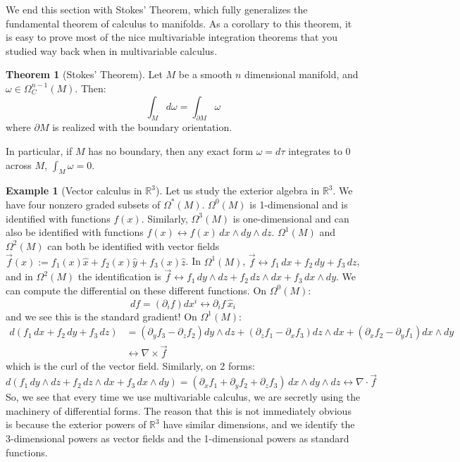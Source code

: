 \documentclass[11pt, oneside]{article}   	%
\theoremstyle{definition}
\newtheorem{theorem}{Theorem}[section]
\newtheorem{example}{Example}[section]
\begin{document}
We end this section with Stokes' Theorem, which fully generalizes the fundamental theorem of calculus to manifolds. 
As a corollary to this theorem, it is easy to prove most of the nice multivariable integration theorems that you studied way 
back when in multivariable calculus.
\begin{theorem}[Stokes' Theorem]
	Let $M$ be a smooth $n$ dimensional manifold, and $\omega\in\Omega_C^{n - 1}(M)$. Then:
	\begin{equation}
		\int_M d\omega = \int_{\partial M}\omega
	\end{equation}
	where $\partial M$ is realized with the boundary orientation.
\end{theorem}

In particular, if $M$ has no boundary, then any exact form $\omega = d\tau$ integrates to 0 across $M$, $\int_M \omega = 0$. 
\begin{example}[Vector calculus in $\mathbb R^3$]
	Let us study the exterior algebra in $\mathbb R^3$. We have four nonzero graded subsets of $\Omega^*(M)$. 
	$\Omega^0(M)$ is 1-dimensional and is identified with functions $f(x)$. Similarly, $\Omega^3(M)$ is 
	one-dimensional and can also be identified with functions $f(x)\leftrightarrow f(x)\,dx\wedge dy\wedge dz$. 
	$\Omega^1(M)$ and $\Omega^2(M)$ can both be identified with vector fields $\vec f(x) := f_1(x)\hat x + f_2(x)\hat y + 
	f_3(x)\hat z$. In $\Omega^1(M)$, $\vec f\leftrightarrow f_1\,dx + f_2\,dy + f_3\,dz$, and in $\Omega^2(M)$ 
	the identification is $\vec f\leftrightarrow f_1 \,dy\wedge dz + f_2\, dz\wedge dx + f_3\, dx\wedge dy$. We can compute 
	the differential on these different functions. On $\Omega^0(M)$:
	\begin{equation}
		df = (\partial_i f)dx^i\leftrightarrow \partial_i f\,\hat x_i
	\end{equation}
	and we see this is the standard gradient! On $\Omega^1(M)$:
	\begin{align}
		d(f_1\,dx + f_2\, dy + f_3\, dz) &= \left(\partial_y f_3 - \partial_z f_2\right)dy\wedge dz + \left(\partial_z f_1 - 
		\partial_x f_3\right)dz\wedge dx + \left(\partial_x f_2-\partial_y f_1\right)dx\wedge dy \nonumber\\
		&\leftrightarrow\nabla\times\vec f
	\end{align}
	which is the curl of the vector field. Similarly, on 2 forms:
	\begin{equation}
		d(f_1\,dy\wedge dz + f_2\,dz\wedge dx + f_3\,dx\wedge dy) = (\partial_x f_1 + \partial_y f_2 + \partial_z f_3)\,
		dx\wedge dy\wedge dz \leftrightarrow\nabla\cdot\vec f
	\end{equation}
	So, we see that every time we use multivariable calculus, we are secretly using the machinery of differential forms. 
	The reason that this is not immediately obvious is because the exterior powers of $\mathbb R^3$ have similar 
	dimensions, and we identify the 3-dimensional powers as vector fields and the 1-dimensional powers as standard
	functions. 
\end{example}
\end{document}
